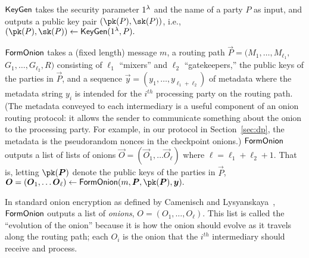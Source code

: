\begin{description}
\item $\mathsf{KeyGen}$ takes the security parameter $1^\lambda$ and the name of a party $P$ as input, and outputs a public key pair $(\pk(P), \sk(P))$, i.e., 
$
(\pk(P), \sk(P)) \gets \keygen(\secparam, P). 
$

\item  $\mathsf{FormOnion}$ takes  
a (fixed length) message $m$, 
a routing path $\vec{P} = (M_1, \dots, M_{\ell_1},$ $G_1, \dots, G_{\ell_2}, R)$ 
consisting of $\ell_1$ ``mixers'' and $\ell_2$ ``gatekeepers,'' 
the public keys of the parties in $\vec{P}$, and 
a sequence $\vec{y} = (y_1, \dots, y_{\ell_1+\ell_2})$ of metadata where the metadata string $y_i$ is intended for the $i^\mathit{th}$ processing party on the routing path.  (The metadata conveyed to each intermediary is a useful component of an onion routing protocol: it allows the sender to communicate something about the onion to the processing party. For example, in our protocol in Section~\ref{sec:dp}, the metadata is the pseudorandom nonces in the checkpoint onions.)  
$\mathsf{FormOnion}$ outputs a list of lists of onions $\vec{O} = (\vec{O}_1, \dots \vec{O}_{\ell})$ where $\ell = \ell_1+\ell_2+1$. 
That is, letting $\pk(\vec{P})$ denote the public keys of the parties in $\vec{P}$, 
$
\vec{O} = (\vec{O}_1, \dots \vec{O}_{\ell}) \gets \formonion(m, \vec{P}, \pk(\vec{P}), \vec{y}). 
$


\hspace{4mm} In standard onion encryption as defined by Camenisch and Lysyanskaya~\cite{C:CamLys05}, $\mathsf{FormOnion}$ outputs a list of \emph{onions}, $O = (O_1, \dots, O_{\ell})$. This list is called the ``evolution of the onion'' because it is how the onion should evolve as it travels along the routing path; each $O_i$ is the onion that the $i^\mathit{th}$ intermediary should receive and process. 


\end{description}

